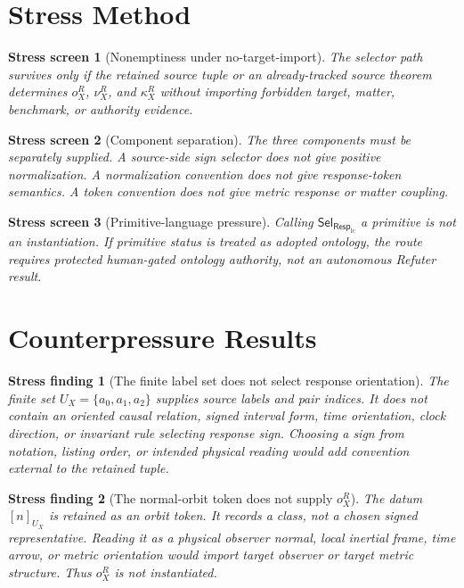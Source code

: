 \documentclass[11pt]{article}
\newcommand{\RespLC}{\mathsf{Resp}_{\mathrm{lc}}}
\newcommand{\SelResp}{\mathsf{Sel}_{\RespLC}}
\newtheorem{stressscreen}{Stress screen}
\newtheorem{stressfinding}{Stress finding}
\begin{document}
\section{Stress Method}

\begin{stressscreen}[Nonemptiness under no-target-import]
The selector path survives only if the retained source tuple or an
already-tracked source theorem determines \(o^R_X\), \(\nu^R_X\), and
\(\kappa^R_X\) without importing forbidden target, matter, benchmark,
or authority evidence.
\end{stressscreen}

\begin{stressscreen}[Component separation]
The three components must be separately supplied. A source-side sign
selector does not give positive normalization. A normalization
convention does not give response-token semantics. A token convention
does not give metric response or matter coupling.
\end{stressscreen}

\begin{stressscreen}[Primitive-language pressure]
Calling \(\SelResp\) a primitive is not an instantiation. If primitive
status is treated as adopted ontology, the route requires protected
human-gated ontology authority, not an autonomous Refuter result.
\end{stressscreen}

\section{Counterpressure Results}

\begin{stressfinding}[The finite label set does not select response orientation]
The finite set \(U_X=\{a_0,a_1,a_2\}\) supplies source labels and pair
indices. It does not contain an oriented causal relation, signed
interval form, time orientation, clock direction, or invariant rule
selecting response sign. Choosing a sign from notation, listing order,
or intended physical reading would add convention external to the
retained tuple.
\end{stressfinding}

\begin{stressfinding}[The normal-orbit token does not supply \(o^R_X\)]
The datum \([n]_{U_X}\) is retained as an orbit token. It records a
class, not a chosen signed representative. Reading it as a physical
observer normal, local inertial frame, time arrow, or metric
orientation would import target observer or target metric structure.
Thus \(o^R_X\) is not instantiated.
\end{stressfinding}
\end{document}
